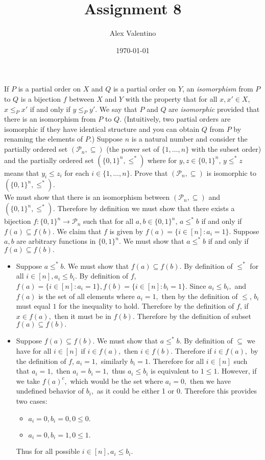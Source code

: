 \documentclass[12pt, letterpaper]{article}
\date{\today}
\author{Alex Valentino}
\title{Assignment 8}
\begin{document}
	If $P$ is a partial order on $X$ and $Q$ is a partial order on $Y$, an \emph{isomorphism} from $P$ to  $Q$ is a bijection $f$ between $X$ and $Y$ with the  property that for all $x,x' \in X$, $x\leq_P x'$ if and only if $y \leq_P y'$.  We say that $P$ and $Q$ are \emph{isomorphic} provided that there is an isomorphism from $P$ to $Q$.  (Intuitively, two partial orders are isomorphic if they have identical structure and you can obtain $Q$ from $P$ by renaming the elements of $P$.)
Suppose $n$ is a natural number and consider 
the partially ordered set $(\mathcal{P}_n,\subseteq)$ (the power set of $\{1,\ldots,n\}$ with the subset order) and the partially ordered set $(\{0,1\}^n,\leq^*)$ where
for $y,z \in \{0,1\}^n$, $y \leq^* z$  means that $y_i \leq z_i$ for each $i \in \{1,\ldots,n\}$.  Prove that $(\mathcal{P}_n,\subseteq)$ is isomorphic to $(\{0,1\}^n, \leq^*)$.\\
We must show that there is an isomorphism between $(\mathcal{P}_n,\subseteq)$ and $(\{0,1\}^n,\leq^*)$.  Therefore by definition we must show that there exists a bijection $f: \{0,1\}^n \to \mathcal{P}_n$ such that for all $a,b \in \{0,1\}^n$, $a \leq^* b$ if and only if $f(a) \subseteq f(b).$  We claim that $f$ is given by $f(a) = \{i \in [n] : a_i = 1\}.$  Suppose $a,b$ are arbitrary functions in $\{0,1\}^n$.  We must show that $a \leq^* b$ if and only if $f(a) \subseteq f(b).$
\begin{itemize}
	\item Suppose $a \leq^* b$.  We must show that $f(a) \subseteq f(b).$  By definition of $\leq^*$ for all $i \in [n], a_i \leq b_i.$  
	By definition of $f$, $f(a) =\{i \in [n] : a_i = 1\}, f(b) = \{i \in [n] : b_i = 1\}$.  Since $a_i \leq b_i,$ and $f(a)$ is the set of all elements where $a_i = 1,$ then by the definition of $\leq$, $b_i$ must equal $1$ for the inequality to hold.  Therefore by the definition of $f$, if $x \in f(a),$ then it must be in $f(b).$  Therefore by the definition of subset $f(a) \subseteq f(b).$	
	\item Suppose $f(a) \subseteq f(b).$  We must show that $a \leq^* b.$  By definition of $\subseteq$ we have for all $i\in [n]$ if $i \in f(a),$ then $i \in f(b).$ Therefore if $i \in f(a),$ by the definition of $f$, $a_i = 1,$ similarly $b_i = 1.$  Therefore for all $i \in [n]$ such that $a_i = 1,$ then $a_i = b_i = 1, $ thus $a_i \leq b_i$ is equivalent to $1 \leq 1.$  However, if we take $f(a)^c,$ which would be the set where $a_i = 0,$ then we have undefined behavior of $b_i,$ as it could be either 1 or 0.  Therefore this provides two cases:
	\begin{itemize}
		\item $a_i = 0, b_i = 0, 0 \leq 0.$
		\item $a_i = 0, b_i = 1, 0 \leq 1.$
\end{itemize}	     
	Thus for all possible $i \in [n], a_i \leq b_i.$
\end{itemize}
\end{document}
